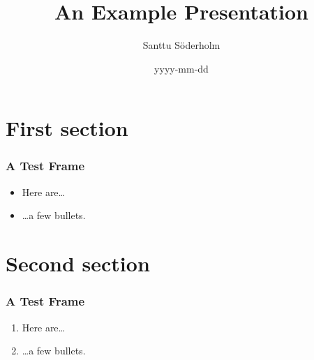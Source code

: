 \documentclass[tikz]{beamer}
\title{An Example Presentation}
\date{yyyy-mm-dd}
\author[Söderholm]{Santtu Söderholm}
\begin{document}
  \begin{frame}
    \titlepage
  \end{frame}

  \begin{frame}
    \tableofcontents
  \end{frame}

  \section{First section}

  \begin{frame}
    \frametitle{A Test Frame}

    \begin{itemize}
      \item Here are\ldots
      \item \ldots a few bullets.
    \end{itemize}

  \end{frame}

  \section{Second section}

  \begin{frame}
    \frametitle{A Test Frame}
    
    \begin{enumerate}
      \item Here are\ldots
      \item \ldots a few bullets.
    \end{enumerate}

  \end{frame}
\end{document}
